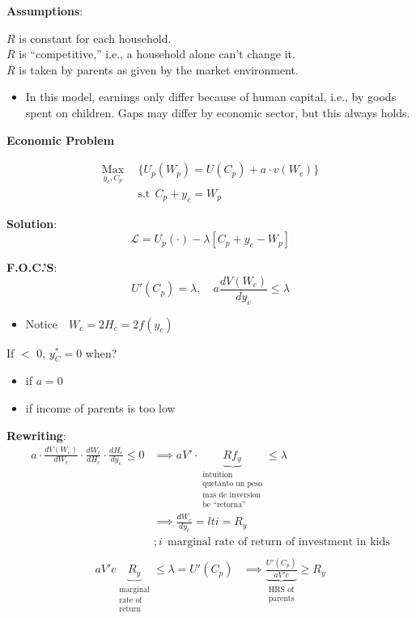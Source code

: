 \documentclass[14pt,notitlepage]{article}
\begin{document}
\vspace{10mm}

\noindent \textbf{Assumptions}:

\noindent $R$ is constant for each household.\\
$R$ is ``competitive,'' i.e., a household alone can't change it.\\
$R$ is taken by parents as given by the market environment.
%
\begin{itemize}
\item In this model, earnings only differ because of human capital, i.e., by goods spent on children. Gaps may differ by economic sector, but this always holds.
\end{itemize}

\textbf{Economic Problem}

\begin{align*}
\underset{y_c,C_p}{\text{Max}}\ \ &\{ U_p(W_p) = U(C_p) + a\cdot v (W_c)\} \\
&\text{s.t}\ \ C_p + y_c = W_p
\end{align*}

\textbf{Solution}:
\begin{equation*}
\mathcal{L} = U_p(\cdot) - \lambda \left[C_p + y_c - W_p \right]
\end{equation*}

\textbf{F.O.C.'S}:
\begin{equation*}
U'(C_p) = \lambda,\quad a\frac{dV(W_c)}{dy_c}\leq \lambda
\end{equation*}

\begin{itemize}
\item Notice\ \ $W_c = 2 H_c = 2f(y_c)$
\end{itemize}

If $<$ 0, $y^*_{C} = 0$  when?
\begin{itemize}
\item if $a = 0$
\item if income of parents is too low
\end{itemize}

\noindent \textbf{Rewriting}:
\begin{align*}
a \cdot \frac{dV(W_c)}{dW_c} \cdot \frac{dW_c}{dH_c} \cdot \frac{dH_c}{dy_c} \leq 0 &\implies a V' \cdot \underbrace{R f_y}_{\substack{\text{intuition} \\ \text{quetanto un peso} \\ \text{mas de inversion} \\ \text{be ``retorna''}}}  \leq \lambda \\
&\implies \frac{dW_c}{dy_c} = \mathit{l t i} = R_y \\
&; i\ \ \text{marginal rate of return of investment in kids} \\
\end{align*}
\begin{align*}
a V' c \underbrace{R_y}_{\substack{\text{marginal} \\ \text{rate of} \\ \text{return}}} \leq \lambda = U'(C_p) &\implies \underbrace{\frac{U'(C_p)}{a V' c}}_{\substack{\text{HRS of} \\ \text{parents}}} \geq R_y
\end{align*}
\end{document}
